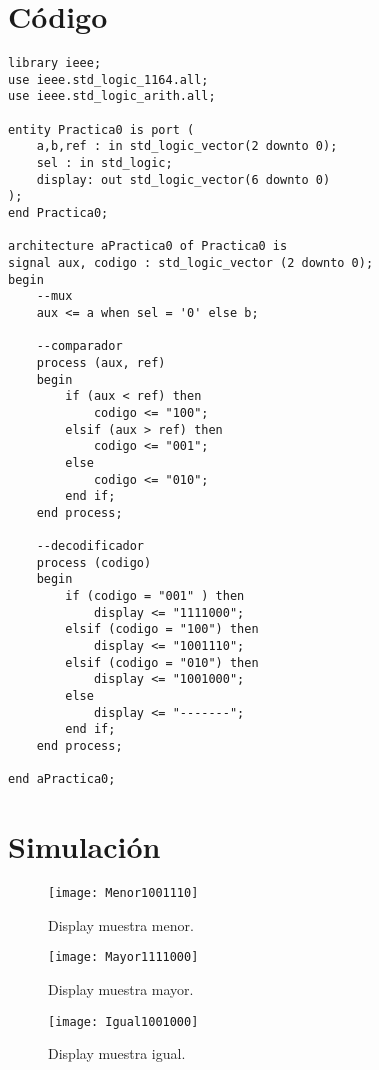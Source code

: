 \documentclass[a4paper,12pt]{article}
\begin{document}
\section{Código}

\begin{lstlisting}
library ieee;
use ieee.std_logic_1164.all;
use ieee.std_logic_arith.all;

entity Practica0 is port (
	a,b,ref : in std_logic_vector(2 downto 0);
	sel : in std_logic;
	display: out std_logic_vector(6 downto 0)
);
end Practica0; 

architecture aPractica0 of Practica0 is
signal aux, codigo : std_logic_vector (2 downto 0);
begin
	--mux
	aux <= a when sel = '0' else b;

	--comparador
	process (aux, ref)
	begin 
		if (aux < ref) then
			codigo <= "100";
		elsif (aux > ref) then 
			codigo <= "001";
	    else
			codigo <= "010";
		end if;
	end process;

	--decodificador
	process (codigo)
	begin 
		if (codigo = "001" ) then
			display <= "1111000";
		elsif (codigo = "100") then 
			display <= "1001110";
		elsif (codigo = "010") then
			display <= "1001000";
		else
			display <= "-------";
		end if;
	end process;

end aPractica0;
\end{lstlisting}

\section{Simulación}

\begin{figure}[h]
\centering
\texttt{[image: Menor1001110]}
\caption{Display muestra menor.}
\end{figure}

\begin{figure}[h]
\centering
\texttt{[image: Mayor1111000]}
\caption{Display muestra mayor.}
\end{figure}

\begin{figure}[h]
\centering
\texttt{[image: Igual1001000]}
\caption{Display muestra igual.}
\end{figure}
\end{document}
